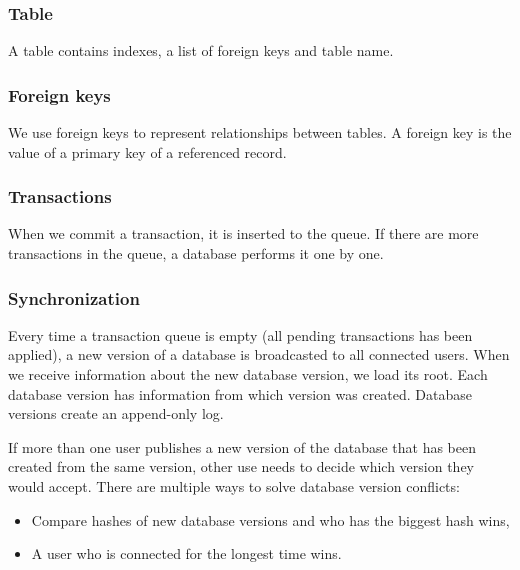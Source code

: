 \subsubsection{Table}
A table contains indexes, a list of foreign keys and table name.

\subsubsection{Foreign keys}
We use foreign keys to represent relationships between tables. A foreign key is the value of a primary key of a referenced record.

\subsubsection{Transactions}
When we commit a transaction, it is inserted to the queue. If there are more transactions in the queue, a database performs it one by one.

\subsubsection{Synchronization} 
Every time a transaction queue is empty (all pending transactions has been applied), a new version of a database is broadcasted to all connected users. When we receive information about the new database version, we load its root. Each database version has information from which version was created. Database versions create an append-only log. 

If more than one user publishes a new version of the database that has been created from the same version, other use needs to decide which version they would accept. There are multiple ways to solve database version conflicts: 
\begin{itemize}
    \item Compare hashes of new database versions and who has the biggest hash wins,
    \item A user who is connected for the longest time wins.
\end{itemize}

